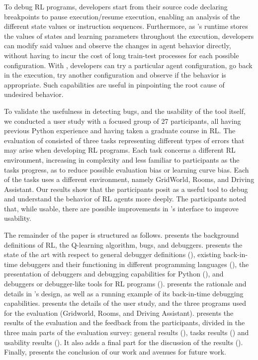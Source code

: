To debug \ac{RL} programs, developers start from their source code declaring breakpoints to pause 
execution/resume execution, enabling an analysis of the different state values or instruction 
sequences. Furthermore, as \flik's runtime stores the values of states and learning parameters 
throughout the execution, developers can modify said values and observe the changes in agent 
behavior directly, without having to incur the cost of long train-test processes for each possible 
configuration. With \flik, developers can try a particular agent configuration, go back in the execution, 
try another configuration and observe if the behavior is appropriate. Such capabilities are useful in 
pinpointing the root cause of undesired behavior. 

To validate the usefulness in detecting bugs, and the usability of the tool itself, we conducted a user 
study with a focused group of 27 participants, all having previous Python experience and having 
taken a graduate course in \ac{RL}. The evaluation of \flik consisted of three tasks representing 
different types of errors that may arise when developing \ac{RL} programs. Each task concerns a 
different \ac{RL} environment, increasing in complexity and less familiar to participants as the 
tasks progress, as to reduce possible evaluation bias or learning curve bias. Each of the tasks uses
a different environment, namely GridWorld, Rooms, and Driving Assistant. Our results show that 
the participants posit \flik as a useful tool to debug and understand the behavior of \ac{RL} agents 
more deeply. The participants noted that, while usable, there are possible improvements in 
\flik's interface to improve usability.

The remainder of the paper is structured as follows.  presents the background 
definitions of \ac{RL}, the Q-learning algorithm, bugs, and debuggers.  
presents the state of the art with respect to general debugger definitions (), existing 
back-in-time debuggers and their functioning in different programming languages (), 
the presentation of debuggers and debugging capabilities for Python (), and debuggers or 
debugger-like tools for \ac{RL} programs ().  presents the rationale and 
details in \flik's design, as well as a running example of its back-in-time debugging capabilities. 
 presents the details of the user study, and the three programs used for the 
evaluation (\ie Gridworld, Rooms, and Driving Assistant).  presents the results of the 
evaluation and the feedback from the participants, divided in the three main parts of the evaluation 
survey: general results (), tasks results () and 
usability results (). It also adds a final part for the discussion of the results 
(). Finally,  presents the conclusion of our work and avenues 
for future work.


\endinput

